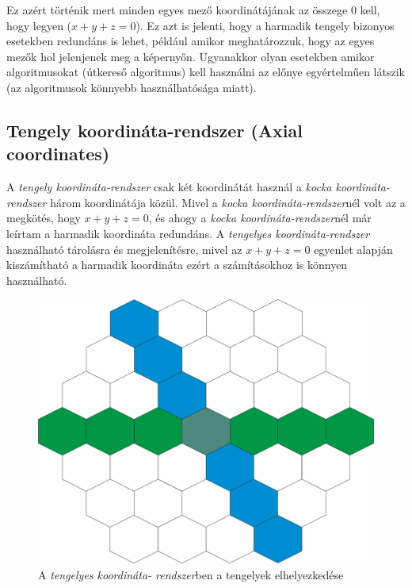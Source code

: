 \noindent Ez azért történik mert minden egyes mező koordinátájának az összege $0$ kell, hogy legyen ($x + y + z = 0$). Ez azt is jelenti, hogy a harmadik tengely bizonyos esetekben redundáns is lehet, például amikor meghatározzuk, hogy az egyes mezők hol jelenjenek meg a képernyőn. Ugyanakkor olyan esetekben amikor algoritmusokat (útkereső algoritmus) kell használni az előnye egyértelműen látszik (az algoritmusok könnyebb használhatósága miatt). 

\subsection{Tengely koordináta-rendszer (Axial coordinates)}

A \textit{tengely koordináta-rendszer} csak két koordinátát használ a \textit{kocka koordináta-rendszer} három koordinátája közül. Mivel a \textit{kocka koordináta-rendszer}nél volt az a megkötés, hogy $x + y + z = 0$, és ahogy a \textit{kocka koordináta-rendszer}nél már leírtam a harmadik koordináta redundáns.  A \textit{tengelyes koordináta-rendszer} használható tárolásra és megjelenítésre, mivel az $x + y + z = 0$ egyenlet alapján kiszámítható a harmadik koordináta ezért a számításokhoz is könnyen használható.

\begin{figure}[h!]
\centering
\includegraphics[scale=0.2]{kepek/AxialCoord.jpg}
\caption{A \textit{tengelyes koordináta-                                   rendszer}ben a tengelyek elhelyezkedése}
\label{fig:AxialCoord}
\end{figure}

